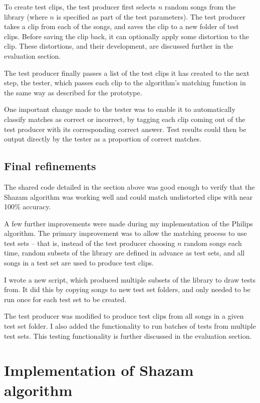 \documentclass[12pt,a4paper,twoside,openright]{report}
\begin{document}
To create test clips, the test producer first selects $n$ random songs from the library (where $n$ is specified as part of the test parameters). The test producer takes a clip from each of the songs, and saves the clip to a new folder of test clips. Before saving the clip back, it can optionally apply some distortion to the clip. These distortions, and their development, are discussed further in the evaluation section. %

The test producer finally passes a list of the test clips it has created to the next step, the tester, which passes each clip to the algorithm's matching function in the same way as described for the prototype.

One important change made to the tester was to enable it to automatically classify matches as correct or incorrect, by tagging each clip coming out of the test producer with its corresponding correct answer. Test results could then be output directly by the tester as a proportion of correct matches.


\subsection{Final refinements}

The shared code detailed in the section above was good enough to verify that the Shazam algorithm was working well and could match undistorted clips with near 100\% accuracy.

A few further improvements were made during my implementation of the Philips algorithm. The primary improvement was to allow the matching process to use test sets -- that is, instead of the test producer choosing $n$ random songs each time, random subsets of the library are defined in advance as test sets, and all songs in a test set are used to produce test clips.

I wrote a new script, which produced multiple subsets of the library to draw tests from. It did this by copying songs to new test set folders, and only needed to be run once for each test set to be created. 

The test producer was modified to produce test clips from all songs in a given test set folder. I also added the functionality to run batches of tests from multiple test sets. This testing functionality is further discussed in the evaluation section. %

\section{Implementation of Shazam algorithm}
\label{section:shazam}
\end{document}
